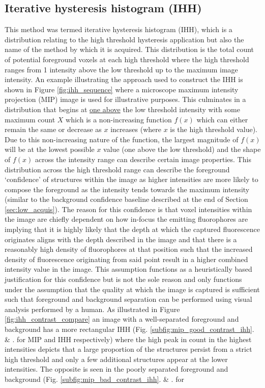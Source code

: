 \subsection{Iterative hysteresis histogram (IHH)}\label{sec:ihh}
This method was termed iterative hysteresis histogram (IHH), which is a distribution relating to the high threshold hysteresis application but also the name of the method by which it is acquired. This distribution is the total count of potential foreground voxels at each high threshold where the high threshold ranges from 1 intensity above the low threshold up to the maximum image intensity. An example illustrating the approach used to construct the IHH is shown in Figure \ref{fig:ihh_sequence} where a microscope maximum intensity projection (MIP) image is used for illustrative purposes. This culminates in a distribution that begins at \underline{one above} the low threshold intensity with some maximum count $X$ which is a non-increasing function $f(x)$ which can either remain the same or decrease as $x$ increases (where $x$ is the high threshold value). Due to this non-increasing nature of the function, the largest magnitude of $f(x)$ will be at the lowest possible $x$ value (one above the low threshold) and the shape of $f(x)$ across the intensity range can describe certain image properties. This distribution across the high threshold range can describe the foreground `confidence' of structures within the image as higher intensities are more likely to compose the foreground as the intensity tends towards the maximum intensity (similar to the background confidence baseline described at the end of Section \ref{sec:low_acquis}). The reason for this confidence is that voxel intensities within the image are chiefly dependent on how in-focus the emitting fluorophores are implying that it is highly likely that the depth at which the captured fluorescence originates aligns with the depth described in the image and that there is a reasonably high density of fluorophores at that position such that the increased density of fluorescence originating from said point result in a higher combined intensity value in the image. This assumption functions as a heuristically based justification for this confidence but is not the sole reason and only functions under the assumption that the quality at which the image is captured is sufficient such that foreground and background separation can be performed using visual analysis performed by a human. As illustrated in Figure \ref{fig:ihh_contrast_compare} an image with a well-separated foreground and background has a more rectangular IHH (Fig. \ref{subfig:mip_good_contrast_ihh}. \& . for MIP and IHH respectively) where the high peak in count in the highest intensities depicts that a large proportion of the structures persist from a strict high threshold and only a few additional structures appear at the lower intensities. The opposite is seen in the poorly separated foreground and background (Fig. \ref{subfig:mip_bad_contrast_ihh}. \& . for 